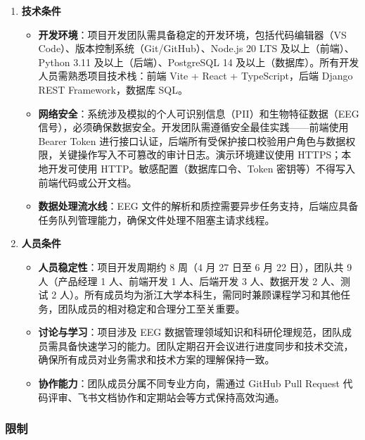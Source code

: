 \begin{enumerate}[(1)]
  \item \textbf{技术条件}
    \begin{itemize}
      \item \textbf{开发环境}：项目开发团队需具备稳定的开发环境，包括代码编辑器（VS Code）、版本控制系统（Git/GitHub）、Node.js 20 LTS 及以上（前端）、Python 3.11 及以上（后端）、PostgreSQL 14 及以上（数据库）。所有开发人员需熟悉项目技术栈：前端 Vite + React + TypeScript，后端 Django REST Framework，数据库 SQL。
      \item \textbf{网络安全}：系统涉及模拟的个人可识别信息（PII）和生物特征数据（EEG 信号），必须确保数据安全。开发团队需遵循安全最佳实践——前端使用 Bearer Token 进行接口认证，后端所有受保护接口校验用户角色与数据权限，关键操作写入不可篡改的审计日志。演示环境建议使用 HTTPS；本地开发可使用 HTTP。敏感配置（数据库口令、Token 密钥等）不得写入前端代码或公开文档。
      \item \textbf{数据处理流水线}：EEG 文件的解析和质控需要异步任务支持，后端应具备任务队列管理能力，确保文件处理不阻塞主请求线程。
    \end{itemize}

  \item \textbf{人员条件}
    \begin{itemize}
      \item \textbf{人员稳定性}：项目开发周期约 8 周（4 月 27 日至 6 月 22 日），团队共 9 人（产品经理 1 人、前端开发 1 人、后端开发 3 人、数据开发 2 人、测试 2 人）。所有成员均为浙江大学本科生，需同时兼顾课程学习和其他任务，团队成员的相对稳定和合理分工至关重要。
      \item \textbf{讨论与学习}：项目涉及 EEG 数据管理领域知识和科研伦理规范，团队成员需具备快速学习的能力。团队定期召开会议进行进度同步和技术交流，确保所有成员对业务需求和技术方案的理解保持一致。
      \item \textbf{协作能力}：团队成员分属不同专业方向，需通过 GitHub Pull Request 代码评审、飞书文档协作和定期站会等方式保持高效沟通。
    \end{itemize}
\end{enumerate}

\subsubsection{限制}


